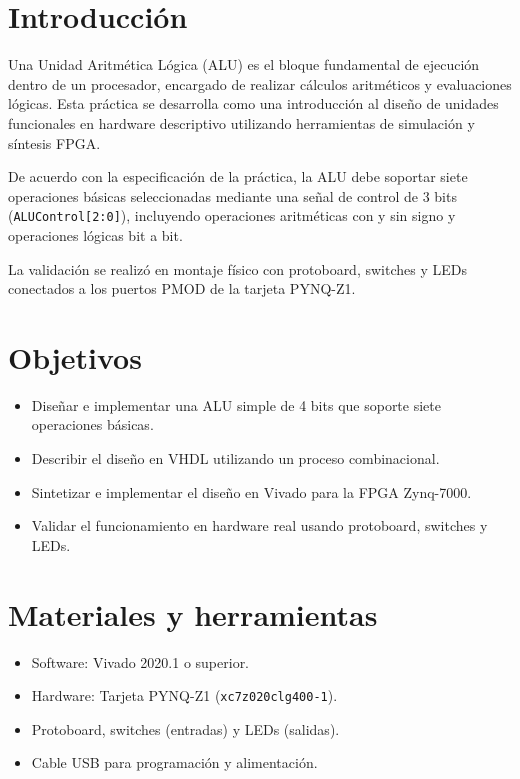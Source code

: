 \documentclass[12pt,letterpaper]{article}
\begin{document}
\twocolumn

\section{Introducción}
Una Unidad Aritmética Lógica (ALU) es el bloque fundamental de ejecución dentro de un procesador, encargado de realizar cálculos aritméticos y evaluaciones lógicas.
Esta práctica se desarrolla como una introducción al diseño de unidades funcionales en hardware descriptivo utilizando herramientas de simulación y síntesis FPGA.

De acuerdo con la especificación de la práctica, la ALU debe soportar siete operaciones básicas seleccionadas mediante una señal de control de 3 bits (\texttt{ALUControl[2:0]}), incluyendo operaciones aritméticas con y sin signo y operaciones lógicas bit a bit.

La validación se realizó en montaje físico con protoboard, switches y LEDs conectados a los puertos PMOD de la tarjeta PYNQ-Z1.

\section{Objetivos}
\begin{itemize}
  \item Diseñar e implementar una ALU simple de 4 bits que soporte siete operaciones básicas.
  \item Describir el diseño en VHDL utilizando un proceso combinacional.
  \item Sintetizar e implementar el diseño en Vivado para la FPGA Zynq-7000.
  \item Validar el funcionamiento en hardware real usando protoboard, switches y LEDs.
\end{itemize}

\section{Materiales y herramientas}
\begin{itemize}
  \item Software: Vivado 2020.1 o superior.
  \item Hardware: Tarjeta PYNQ-Z1 (\texttt{xc7z020clg400-1}).
  \item Protoboard, switches (entradas) y LEDs (salidas).
  \item Cable USB para programación y alimentación.
\end{itemize}
\end{document}
